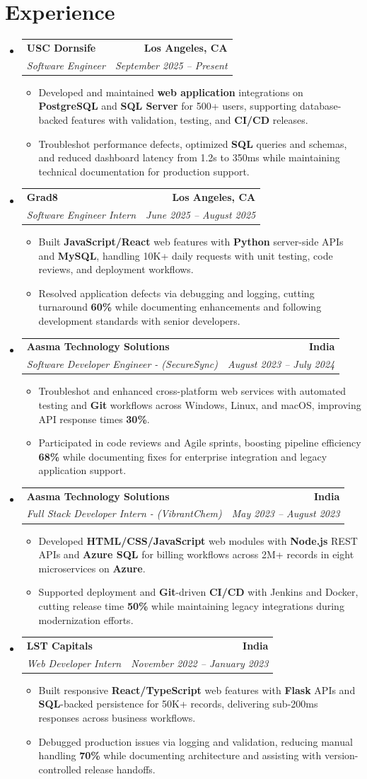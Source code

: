 \documentclass[letterpaper,10pt]{article}
\makeatletter
\newcommand{\resumeItem}[1]{\item\small{{#1 \vspace{-2pt}}}}
\newcommand{\resumeSubheading}[4]{\vspace{-1pt}\item\begin{tabular*}{1.0\textwidth}[t]{l@{\extracolsep{\fill}}r}\textbf{#1} & \textbf{\small #2} \\\textit{\small#3} & \textit{\small #4} \\\end{tabular*}\vspace{-2pt}}
\newcommand{\resumeSubHeadingListStart}{\begin{itemize}[leftmargin=0.0in, label={}]}
\newcommand{\resumeSubHeadingListEnd}{\end{itemize}}
\newcommand{\resumeItemListStart}{\begin{itemize}[leftmargin=0.15in,label=\textbullet,itemsep=2pt,topsep=0pt,parsep=0pt,partopsep=0pt]}
\newcommand{\resumeItemListEnd}{\end{itemize}\vspace{-4pt}}
\makeatother
\begin{document}
\section{Experience}
\resumeSubHeadingListStart
\resumeSubheading{USC Dornsife}{Los Angeles, CA}{Software Engineer}{September 2025 -- Present}
\resumeItemListStart
\resumeItem{Developed and maintained \textbf{web application} integrations on \textbf{PostgreSQL} and \textbf{SQL Server} for 500+ users, supporting database-backed features with validation, testing, and \textbf{CI/CD} releases.}
\resumeItem{Troubleshot performance defects, optimized \textbf{SQL} queries and schemas, and reduced dashboard latency from 1.2s to 350ms while maintaining technical documentation for production support.}
\resumeItemListEnd
\resumeSubheading{Grad8}{Los Angeles, CA}{Software Engineer Intern}{June 2025 -- August 2025}
\resumeItemListStart
\resumeItem{Built \textbf{JavaScript/React} web features with \textbf{Python} server-side APIs and \textbf{MySQL}, handling 10K+ daily requests with unit testing, code reviews, and deployment workflows.}
\resumeItem{Resolved application defects via debugging and logging, cutting turnaround \textbf{60\%} while documenting enhancements and following development standards with senior developers.}
\resumeItemListEnd
\resumeSubheading{Aasma Technology Solutions}{India}{Software Developer Engineer - (SecureSync)}{August 2023 -- July 2024}
\resumeItemListStart
\resumeItem{Troubleshot and enhanced cross-platform web services with automated testing and \textbf{Git} workflows across Windows, Linux, and macOS, improving API response times \textbf{30\%}.}
\resumeItem{Participated in code reviews and Agile sprints, boosting pipeline efficiency \textbf{68\%} while documenting fixes for enterprise integration and legacy application support.}
\resumeItemListEnd
\resumeSubheading{Aasma Technology Solutions}{India}{Full Stack Developer Intern - (VibrantChem)}{May 2023 -- August 2023}
\resumeItemListStart
\resumeItem{Developed \textbf{HTML/CSS/JavaScript} web modules with \textbf{Node.js} REST APIs and \textbf{Azure SQL} for billing workflows across 2M+ records in eight microservices on \textbf{Azure}.}
\resumeItem{Supported deployment and \textbf{Git}-driven \textbf{CI/CD} with Jenkins and Docker, cutting release time \textbf{50\%} while maintaining legacy integrations during modernization efforts.}
\resumeItemListEnd
\resumeSubheading{LST Capitals}{India}{Web Developer Intern}{November 2022 -- January 2023}
\resumeItemListStart
\resumeItem{Built responsive \textbf{React/TypeScript} web features with \textbf{Flask} APIs and \textbf{SQL}-backed persistence for 50K+ records, delivering sub-200ms responses across business workflows.}
\resumeItem{Debugged production issues via logging and validation, reducing manual handling \textbf{70\%} while documenting architecture and assisting with version-controlled release handoffs.}
\resumeItemListEnd
\resumeSubHeadingListEnd
\vspace{-6pt}
\end{document}
